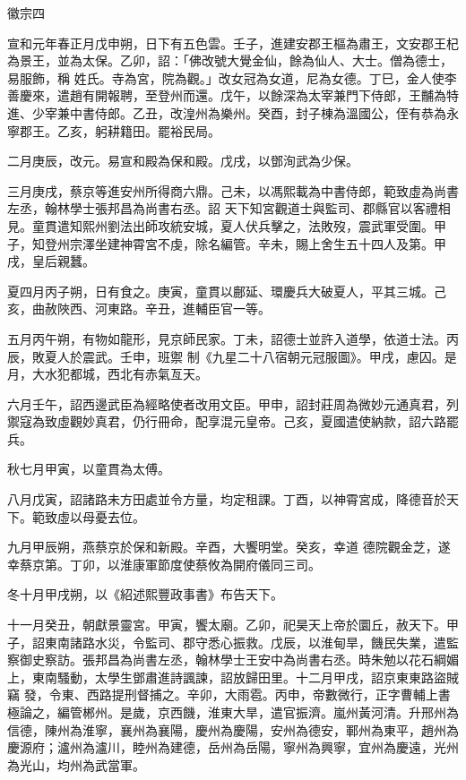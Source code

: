 
\begin{pinyinscope}

 徽宗四



 宣和元年春正月戊申朔，日下有五色雲。壬子，進建安郡王樞為肅王，文安郡王杞為景王，並為太保。乙卯，詔：「佛改號大覺金仙，餘為仙人、大士。僧為德士，易服飾，稱
 姓氏。寺為宮，院為觀。」改女冠為女道，尼為女德。丁巳，金人使李善慶來，遣趙有開報聘，至登州而還。戊午，以餘深為太宰兼門下侍郎，王黼為特進、少宰兼中書侍郎。乙丑，改湟州為樂州。癸酉，封子棟為溫國公，侄有恭為永寧郡王。乙亥，躬耕籍田。罷裕民局。



 二月庚辰，改元。易宣和殿為保和殿。戊戌，以鄧洵武為少保。



 三月庚戌，蔡京等進安州所得商六鼎。己未，以馮熙載為中書侍郎，範致虛為尚書左丞，翰林學士張邦昌為尚書右丞。詔
 天下知宮觀道士與監司、郡縣官以客禮相見。童貫遣知熙州劉法出師攻統安城，夏人伏兵擊之，法敗歿，震武軍受圍。甲子，知登州宗澤坐建神霄宮不虔，除名編管。辛未，賜上舍生五十四人及第。甲戌，皇后親蠶。



 夏四月丙子朔，日有食之。庚寅，童貫以鄜延、環慶兵大破夏人，平其三城。己亥，曲赦陜西、河東路。辛丑，進輔臣官一等。



 五月丙午朔，有物如龍形，見京師民家。丁未，詔德士並許入道學，依道士法。丙辰，敗夏人於震武。壬申，班禦
 制《九星二十八宿朝元冠服圖》。甲戌，慮囚。是月，大水犯都城，西北有赤氣亙天。



 六月壬午，詔西邊武臣為經略使者改用文臣。甲申，詔封莊周為微妙元通真君，列禦寇為致虛觀妙真君，仍行冊命，配享混元皇帝。己亥，夏國遣使納款，詔六路罷兵。



 秋七月甲寅，以童貫為太傅。



 八月戊寅，詔諸路未方田處並令方量，均定租課。丁酉，以神霄宮成，降德音於天下。範致虛以母憂去位。



 九月甲辰朔，燕蔡京於保和新殿。辛酉，大饗明堂。癸亥，幸道
 德院觀金芝，遂幸蔡京第。丁卯，以淮康軍節度使蔡攸為開府儀同三司。



 冬十月甲戌朔，以《紹述熙豐政事書》布告天下。



 十一月癸丑，朝獻景靈宮。甲寅，饗太廟。乙卯，祀昊天上帝於圜丘，赦天下。甲子，詔東南諸路水災，令監司、郡守悉心振救。戊辰，以淮甸旱，饑民失業，遣監察御史察訪。張邦昌為尚書左丞，翰林學士王安中為尚書右丞。時朱勉以花石綱媚上，東南騷動，太學生鄧肅進詩諷諫，詔放歸田里。十二月甲戌，詔京東東路盜賊竊
 發，令東、西路提刑督捕之。辛卯，大雨雹。丙申，帝數微行，正字曹輔上書極論之，編管郴州。是歲，京西饑，淮東大旱，遣官振濟。嵐州黃河清。升邢州為信德，陳州為淮寧，襄州為襄陽，慶州為慶陽，安州為德安，鄆州為東平，趙州為慶源府；瀘州為瀘川，睦州為建德，岳州為岳陽，寧州為興寧，宜州為慶遠，光州為光山，均州為武當軍。




\end{pinyinscope}
